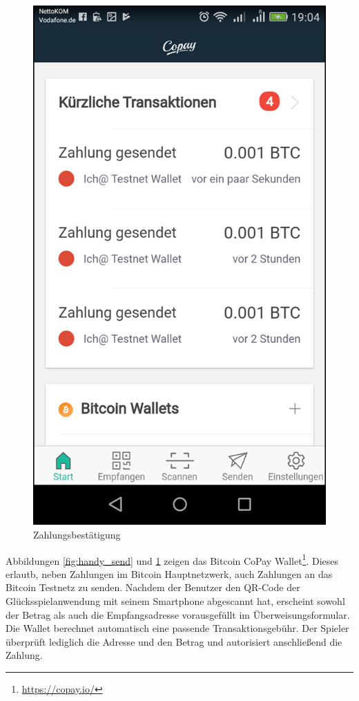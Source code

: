 \begin{minipage}{0.48\textwidth}
\begin{figure}[H]
\centering
\includegraphics[width=1\linewidth]{Figures/btc_gui/handy_confirm}
\decoRule
\caption{Zahlungsbestätigung}
\label{fig:handy_confirm}
\end{figure}
\end{minipage}

Abbildungen \ref{fig:handy_send} und \ref{fig:handy_confirm} zeigen das Bitcoin CoPay Wallet\footnote{\url{https://copay.io/}}. Dieses erlautb, neben Zahlungen im Bitcoin Hauptnetzwerk, auch Zahlungen an das Bitcoin Testnetz zu senden. Nachdem der Benutzer den QR-Code der Glücksspielanwendung mit seinem Smartphone abgescannt hat, erscheint sowohl der Betrag als auch die Empfangsadresse vorausgefüllt im Überweisungsformular. Die Wallet berechnet automatisch eine passende Transaktionsgebühr. Der Spieler überprüft lediglich die Adresse und den Betrag und  autorisiert anschließend die Zahlung.

